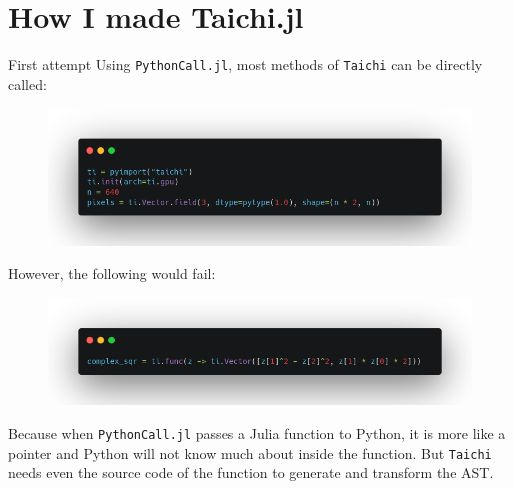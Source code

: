 \documentclass{beamer}
\begin{document}
\section{How I made Taichi.jl}
\begin{frame}[allowframebreaks]{First attempt}
    Using \texttt{PythonCall.jl}, most methods of \texttt{Taichi} can be directly called:
    \begin{figure}[htpb]
        \begin{center}
            \includegraphics[width=\linewidth]{pic/code_01.png}
        \end{center}
    \end{figure}

    \framebreak
    However, the following would fail:
    \begin{figure}[htpb]
        \begin{center}
            \includegraphics[width=\linewidth]{pic/code_02.png}
        \end{center}
    \end{figure}
    Because when \texttt{PythonCall.jl} passes a Julia function to Python, it is more like a pointer and Python will not know much about inside the function. But \texttt{Taichi} needs even the source code of the function to generate and transform the AST.
\end{frame}
\end{document}
